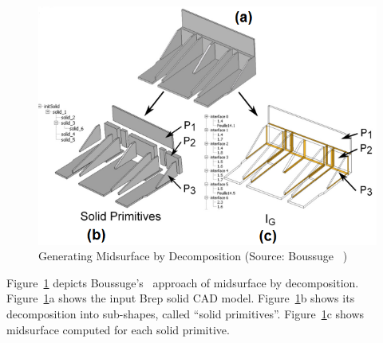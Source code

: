 
	\begin{figure} [!h]
		\centering
		\includegraphics[width=0.75\linewidth]{..//Common/images/boussugedecomp}
		\caption{Generating Midsurface by Decomposition (Source: Boussuge~\cite{Boussuge2013a} )}
		\label{fig:litsurvey:boussugedecomp}
	\end{figure}


Figure~\ref{fig:litsurvey:boussugedecomp} depicts Boussuge's~\cite{Boussuge2013a} approach of midsurface by decomposition.
Figure~\ref{fig:litsurvey:boussugedecomp}a shows the input Brep solid CAD model. Figure~\ref{fig:litsurvey:boussugedecomp}b shows its decomposition into sub-shapes, called ``solid primitives''. Figure~\ref{fig:litsurvey:boussugedecomp}c shows midsurface computed for each solid primitive.



